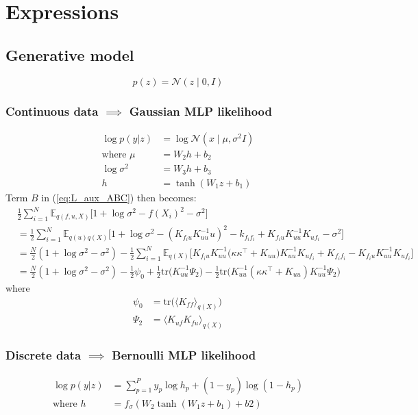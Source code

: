\documentclass[12pt]{article}
\begin{document}
\section{Expressions}
\subsection{Generative model}
%
\begin{equation}
    p(z) = \mathcal{N}(z\mid 0, I)
\end{equation}
%
\subsubsection{Continuous data $\implies$ Gaussian MLP likelihood}
%
\begin{align}
    \log p(y|z) &= \log\mathcal{N}(x\mid \mu, \sigma^2 I)\\
    \text{where } \mu &= W_2 h + b_2\\
    \log\sigma^2 &= W_3 h + b_3\\
    h &= \tanh(W_1 z + b_1)
\end{align}
Term $B$ in (\ref{eq:L_aux_ABC}) then becomes:
%
\begin{align}
    &\frac{1}{2}\sum_{i=1}^N \mathbb{E}_{q(f,u,X)}\big[ 1 + \log\sigma^2 - f(X_i)^2 - \sigma^2 \big]\\
    &= \frac{1}{2}\sum_{i=1}^N \mathbb{E}_{q(u)q(X)}\big[ 1 + \log\sigma^2 - (K_{f_iu}K_{uu}^{-1}u)^2 - k_{f_if_i} + K_{f_iu}K_{uu}^{-1}K_{uf_i}-\sigma^2 \big]\\
    &= \frac{N}{2}(1 + \log\sigma^2 - \sigma^2) - \frac{1}{2}\sum_{i=1}^N\mathbb{E}_{q(X)}\big[ K_{f_iu}K_{uu}^{-1}\big( \kappa\kappa^\top + K_{uu} \big)K_{uu}^{-1}K_{uf_i} + K_{f_if_i} - K_{f_iu}K_{uu}^{-1}K_{uf_i} \big]\\
    &= \frac{N}{2}(1 + \log\sigma^2 - \sigma^2) - \frac{1}{2}\psi_0 + \frac{1}{2}\text{tr}\big( K_{uu}^{-1}\Psi_2 \big) - \frac{1}{2}\text{tr}\big( K_{uu}^{-1}(\kappa\kappa^\top + K_{uu})K_{uu}^{-1}\Psi_2 \big)
\end{align}
%
where
\begin{align}
    \psi_0 &= \text{tr}\big( \langle K_{ff}\rangle_{q(X)} \big)\\
    \Psi_2 &= \langle K_{uf}K_{fu}\rangle_{q(X)}
\end{align}
%
\subsubsection{Discrete data $\implies$ Bernoulli MLP likelihood}
%
\begin{align}
    \log p(y|z) &= \sum_{p=1}^P y_p\log h_p + (1-y_p)\log (1-h_p)\\
    \text{where } h &= f_{\sigma}(W_2 \tanh(W_1 z + b_1) + b2)
\end{align}
\end{document}
